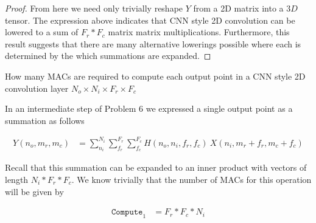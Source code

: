 \documentclass[11pt]{article}
\begin{document}
\begin{proof}
	From here we need only trivially reshape $Y$ from a 2D matrix into a $3D$
	tensor. The expression above indicates that CNN style 2D convolution can be
	lowered to a sum of $F_r * F_c$ matrix matrix multiplications. Furthermore,
	this result suggests that there are many alternative lowerings possible
	where each is determined by the which summations are expanded.

\end{proof}

How many MACs are required to compute each output point in a CNN style 2D
convolution layer $N_o \times N_i \times F_r \times F_c$

\begin{solution}
	In an intermediate step of Problem 6 we expressed a single output point as
	a summation as follows

	\begin{align}
		Y(n_o, m_r, m_c) &= \sum_{n_i}^{N_i}\sum_{f_r}^{F_r}\sum_{f_c}^{F_c}
		H(n_o, n_i, f_r, f_c)\ X(n_i, m_r + f_r, m_c + f_c)
	\end{align}

	Recall that this summation can be expanded to an inner product with vectors
	of length $N_i * F_r * F_c$. We know trivially that the number of MACs for
	this operation will be given by

	\begin{align}
		\texttt{Compute}_1 &= F_r * F_c * N_i
	\end{align}

\end{solution}
\end{document}
